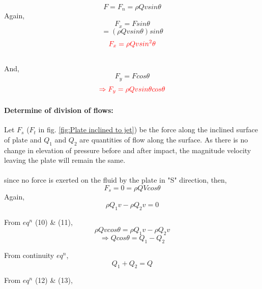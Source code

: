 \documentclass{article}
\begin{document}
$$F = F_n = \rho Q v sin\theta $$
Again, $$F_x = F sin\theta$$
$$= (\rho Q v sin \theta) sin \theta $$
\begin{equation}
	\textcolor{red}{F_x = \rho Q v sin^2 \theta} \label{eq:eq8}
\end{equation}
\\
And, $$F_y = F cos\theta$$
\begin{equation}
	\textcolor{red}{\Rightarrow F_y = \rho Q v sin\theta cos\theta} \label{eq:eq9}
\end{equation}
\vspace{0.25cm}
\paragraph*{Determine of division of flows:}
Let $F_s$ ($F_t$ in fig. \ref{fig:Plate inclined to jet}) be the force along the inclined surface of plate and $Q_1$ and $Q_2$ are quantities of flow along the surface. As there is no change in elevation of pressure before and after impact, the magnitude velocity leaving the plate will remain the same. \\
\\
since no force is exerted on the fluid by the plate in "S" direction, then,
\begin{equation}
	F_s = 0 = \rho Q V cos\theta \label{eq:eq10}
\end{equation}
Again, 
\begin{equation}
	\rho Q_1 v - \rho Q_2 v = 0 \label{eq:eq11}
\end{equation}

From $eq^n$ (10) \& (11),
$$\rho Q v cos\theta = \rho Q_1 v - \rho Q_2 v $$
\begin{equation}
	\Rightarrow Q cos\theta = Q_1 - Q_2 \label{eq:eq12}
\end{equation}

From continuity $eq^n$, 
\begin{equation}
	Q_1 + Q_2 = Q \label{eq:eq13}
\end{equation}

From $eq^n$ (12) \& (13),

\pagebreak
\end{document}
